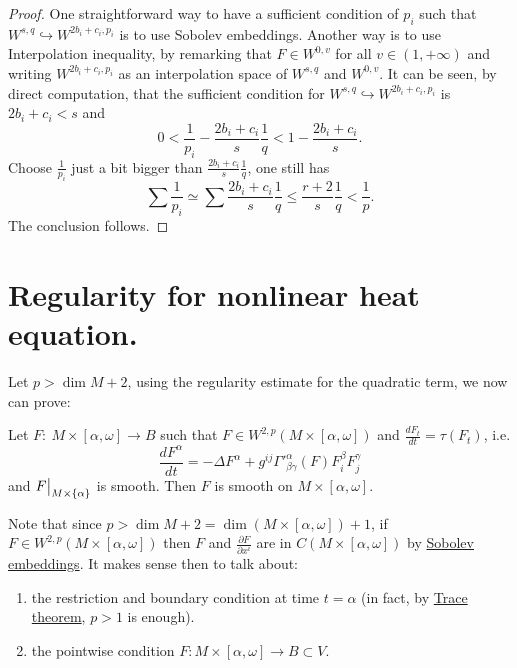 \begin{proof}
One straightforward way to have a sufficient condition of \(p_i\) such that \(W^{s,q}
\hookrightarrow W^{2b_i+c_i,p_i}\) is to use Sobolev embeddings. Another way is to use
Interpolation inequality, by remarking that \(F\in W^{0,v}\) for all \(v\in (1,+\infty)\) and writing \(W^{2b_i+c_i, p_i}\) as an interpolation space of \(W^{s,q}\) and \(W^{0,v}\). It can be seen, by direct computation, that the sufficient condition for \(W^{s,q}
\hookrightarrow W^{2b_i+c_i,p_i}\) is \(2b_i+c_i < s\) and
\[
 0 < \frac{1}{p_i} - \frac{2b_i+c_i}{s}\frac{1}{q} < 1 - \frac{2b_i + c_i}{s}.
\]
Choose \(\frac{1}{p_i}\) just a bit bigger than \(\frac{2b_i+c_i}{s}\frac{1}{q}\), one
still has
\[
\sum \frac{1}{p_i} \simeq \sum  \frac{2b_i+c_i}{s}\frac{1}{q} \leq \frac{r+2}{s}\frac{1}{q} < \frac{1}{p}.
\]
The conclusion follows.  
\end{proof}



\section{Regularity for nonlinear heat equation.}
\label{sec:org429b531}
Let \(p>\dim M + 2\), using the regularity estimate for the quadratic term, we now can prove:

\begin{theorem}
\label{thm:reg-nonlin-heat}
Let \(F:\ M\times [\alpha,\omega] \longrightarrow B\) such that \(F\in W^{2,p}(M\times
[\alpha,\omega])\) and \(\frac{d F_t}{dt} = \tau(F_t)\), i.e.
\[
 \frac{d F^\alpha}{dt} = -\Delta F^\alpha + g^{ij}\Gamma'^\alpha_{\beta\gamma}(F)
F^\beta_i F^\gamma_j
\]
and \(\restr{F}{M\times\{\alpha\}}\) is smooth. Then \(F\) is smooth on \(M\times [\alpha,\omega]\).
\end{theorem}

\begin{remark}
Note that since \(p > \dim M + 2 = \dim (M\times [\alpha,\omega])+1\), if \(F\in
W^{2,p}(M\times[\alpha,\omega])\) then \(F\) and \(\frac{\partial F}{\partial
x^i}\) are in \(C(M\times[\alpha,\omega])\) by \href{sobolev-riemannian.org}{Sobolev embeddings}. It makes sense then to talk
about:
\begin{enumerate}
\item the restriction and boundary condition at time \(t=\alpha\) (in fact, by \href{interpolation-sobolev.org}{Trace theorem}, \(p>1\) is enough).
\item the pointwise condition \(F: M\times [\alpha,\omega] \longrightarrow
   B\subset V\).
\end{enumerate}
\end{remark}

